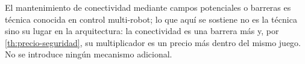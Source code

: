 \begin{observacion}[Atribución]
\label{obs:atribucion-conectividad}
El mantenimiento de conectividad mediante campos potenciales o barreras es
técnica conocida en control multi-robot; lo que aquí se sostiene no es la
técnica sino su lugar en la arquitectura: la conectividad es una barrera más y,
por \cref{th:precio-seguridad}, su multiplicador es un precio más dentro del
mismo juego. No se introduce ningún mecanismo adicional.
\end{observacion}
